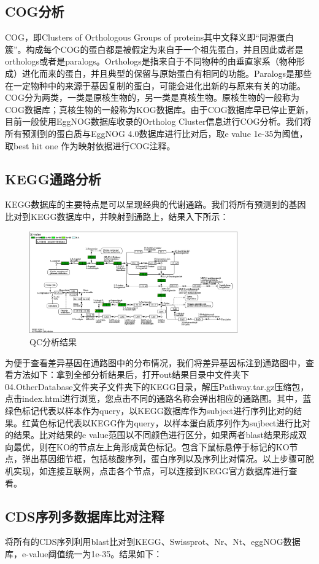 \subsection{COG分析}
COG，即Clusters of Orthologous Groups of proteins其中文释义即“同源蛋白簇”。构成每个COG的蛋白都是被假定为来自于一个祖先蛋白，并且因此或者是orthologs或者是paralogs。Orthologs是指来自于不同物种的由垂直家系（物种形成）进化而来的蛋白，并且典型的保留与原始蛋白有相同的功能。Paralogs是那些在一定物种中的来源于基因复制的蛋白，可能会进化出新的与原来有关的功能。COG分为两类，一类是原核生物的，另一类是真核生物。原核生物的一般称为COG数据库；真核生物的一般称为KOG数据库。由于COG数据库早已停止更新，目前一般使用EggNOG数据库收录的Ortholog Cluster信息进行COG分析。我们将所有预测到的蛋白质与EggNOG 4.0\cite{eggNOG}数据库进行比对后，取e value 1e-35为阈值，取best hit one 作为映射依据进行COG注释。
\subsection{KEGG通路分析}
KEGG\cite{KEGG}\cite{KOBAS}数据库的主要特点是可以呈现经典的代谢通路。我们将所有预测到的基因比对到KEGG数据库中，并映射到通路上，结果入下所示：
\begin{figure}[H]

    \centering
    \includegraphics[width=0.8\textwidth]{map00300.png}
    \captionsetup{labelsep=period}
    \caption{QC分析结果}
\end{figure}
为便于查看差异基因在通路图中的分布情况，我们将差异基因标注到通路图中，查看方法如下：拿到全部分析结果后，打开out结果目录中文件夹下04.OtherDatabase文件夹子文件夹下的KEGG目录，解压Pathway.tar.gz压缩包，点击index.html进行浏览，您点击不同的通路名称会弹出相应的通路图。其中，蓝绿色标记代表以样本作为query，以KEGG数据库作为subject进行序列比对的结果。红黄色标记代表以KEGG作为query，以样本蛋白质序列作为sujbect进行比对的结果。比对结果的e value范围以不同颜色进行区分，如果两者blast结果形成双向最优，则在KO的节点左上角形成黄色标记。包含下鼠标悬停于标记的KO节点，弹出基因细节框，包括核酸序列，蛋白序列以及序列比对情况。以上步骤可脱机实现，如连接互联网，点击各个节点，可以连接到KEGG官方数据库进行查看。


\subsection{CDS序列多数据库比对注释}
将所有的CDS序列利用blast比对到KEGG、Swissprot、Nr、Nt、eggNOG数据库，e-value阈值统一为1e-35。结果如下：

